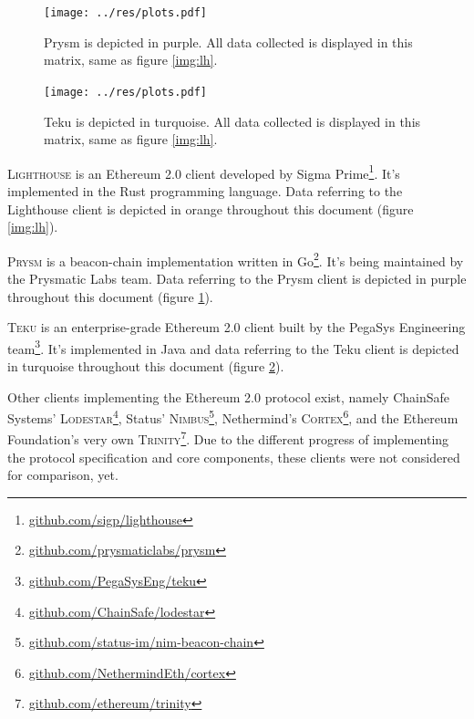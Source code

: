 \documentclass[twoside,twocolumn]{article}
\begin{document}
\begin{figure}[t]
	\centering
	\texttt{[image: ../res/plots.pdf]}
	\caption{Prysm is depicted in purple. All data collected is displayed in this matrix, same as figure \ref{img:lh}.}
	\label{img:pr}
\end{figure}

\begin{figure}[t]
	\centering
	\texttt{[image: ../res/plots.pdf]}
	\caption{Teku is depicted in turquoise. All data collected is displayed in this matrix, same as figure \ref{img:lh}.}
	\label{img:tk}
\end{figure}

\textsc{Lighthouse} is an Ethereum 2.0 client developed by Sigma Prime\footnote{\href{https://github.com/sigp/lighthouse}{github.com/sigp/lighthouse}}. It's implemented in the Rust programming language. Data referring to the Lighthouse client is depicted in orange throughout this document (figure \ref{img:lh}).\par

\textsc{Prysm} is a beacon-chain implementation written in Go\footnote{\href{https://github.com/prysmaticlabs/prysm}{github.com/prysmaticlabs/prysm}}. It's being maintained by the Prysmatic Labs team. Data referring to the Prysm client is depicted in purple throughout this document (figure \ref{img:pr}).\par

\textsc{Teku} is an enterprise-grade Ethereum 2.0 client built by the PegaSys Engineering team\footnote{\href{https://github.com/PegaSysEng/teku}{github.com/PegaSysEng/teku}}. It's implemented in Java and data referring to the Teku client is depicted in turquoise throughout this document (figure \ref{img:tk}).\par

Other clients implementing the Ethereum 2.0 protocol exist, namely ChainSafe Systems' \textsc{Lodestar}\footnote{\href{https://github.com/ChainSafe/lodestar}{github.com/ChainSafe/lodestar}}, Status' \textsc{Nimbus}\footnote{\href{https://github.com/status-im/nim-beacon-chain}{github.com/status-im/nim-beacon-chain}}, Nethermind's \textsc{Cortex}\footnote{\href{https://github.com/NethermindEth/cortex}{github.com/NethermindEth/cortex}}, and the Ethereum Foundation's very own \textsc{Trinity}\footnote{\href{https://github.com/ethereum/trinity}{github.com/ethereum/trinity}}. Due to the different progress of implementing the protocol specification and core components, these clients were not considered for comparison, yet.\par
\end{document}
